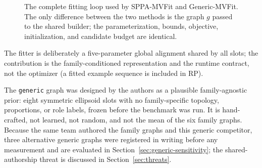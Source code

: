 \documentclass[11pt,a4paper]{article}
\begin{document}
\begin{figure}[H]
\centering
{}
\caption{The complete fitting loop used by SPPA-MVFit and Generic-MVFit. The
only difference between the two methods is the graph \(g\) passed to the
shared builder; the parameterization, bounds, objective, initialization, and
candidate budget are identical.}
\label{alg:mvfit}
\end{figure} The fitter is deliberately a five-parameter global
alignment shared by all slots; the contribution is the family-conditioned
representation and the runtime contract, not the optimizer (a fitted example
sequence is included in RP).

The \texttt{generic} graph was designed by the authors as a plausible
family-agnostic prior: eight symmetric ellipsoid slots with no
family-specific topology, proportions, or role labels, frozen before the
benchmark was run. It is hand-crafted, not learned, not random, and not the
mean of the six family graphs. Because the same team authored the family
graphs and this generic competitor, three alternative generic graphs were
registered in writing before any measurement and are evaluated in
Section~\ref{sec:generic-sensitivity}; the shared-authorship threat is
discussed in Section~\ref{sec:threats}.
\end{document}
